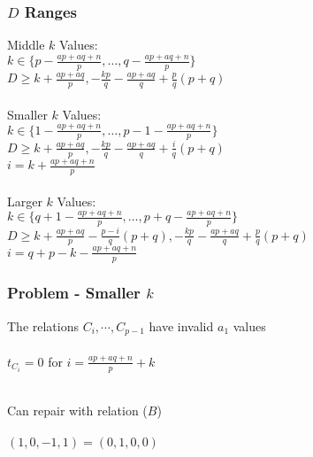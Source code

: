 \documentclass{beamer}
\begin{document}
\begin{frame}[noframenumbering]
\begin{center}
\frametitle{$D$ Ranges}

{\footnotesize
Middle $k$ Values:\\
$k \in \{p - \frac{a p + a q + n}{p}, \dots, q - \frac{a p + a q + n}{p}\}$\\
$D \ge k + \frac{a p + a q}{p}, - \frac{k p}{q} - \frac{a p + a q}{q} + \frac{p}{q} \left( p + q \right)$\\

~\\

Smaller $k$ Values:\\
$k \in \{1 - \frac{a p + a q + n}{p}, \dots, p - 1 - \frac{a p + a q + n}{p}\}$\\
$D \ge k + \frac{a p + a q}{p}, - \frac{k p}{q} - \frac{a p + a q}{q} + \frac{i}{q} \left( p + q \right)$\\
$i = k + \frac{a p + a q + n}{p}$\\

~\\

Larger $k$ Values:\\
$k \in \{q + 1 - \frac{a p + a q + n}{p}, \dots, p + q - \frac{a p + a q + n}{p}\}$
$D \ge k + \frac{a p + a q}{p} - \frac{p - i}{q} \left( p + q \right), - \frac{k p}{q} - \frac{a p + a q}{q} + \frac{p}{q} \left( p + q \right)$\\
$i = q + p - k - \frac{a p + a q + n}{p}$\\
}

\end{center}
\end{frame}


\begin{frame}[noframenumbering]
\begin{center}
\frametitle{Problem - Smaller $k$}

The relations $C_i, \cdots, C_{p - 1}$ have invalid $a_1$ values\\

~\\

$t_{C_i} = 0$ for $i = \frac{a p + a q + n}{p} + k$\

~\\

Can repair with relation ($B$)\\

~\\

$\left(1, 0, - 1, 1\right) = \left(0, 1, 0, 0\right)$

\end{center}
\end{frame}
\end{document}
